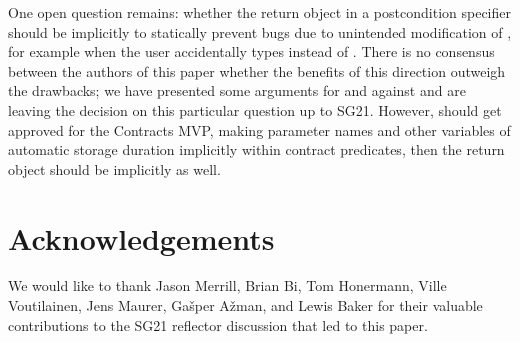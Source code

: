 One open question remains: whether the return object  in a postcondition specifier should be implicitly  to statically prevent bugs due to unintended modification of , for example when the user accidentally types \tcode{=} instead of \tcode{==}. There is no consensus between the authors of this paper whether the benefits of this direction outweigh the drawbacks; we have presented some arguments for and against and are leaving the decision on this particular question up to SG21. However, should \cite{P3071R0} get approved for the Contracts MVP, making parameter names and other variables of automatic storage duration implicitly  within contract predicates, then the return object should be implicitly  as well.






\section*{Acknowledgements}

We would like to thank Jason Merrill, Brian Bi, Tom Honermann, Ville Voutilainen, Jens Maurer, Ga\v sper A\v zman, and Lewis Baker for their valuable contributions to the SG21 reflector discussion that led to this paper.


\renewcommand{\bibname}{References}





